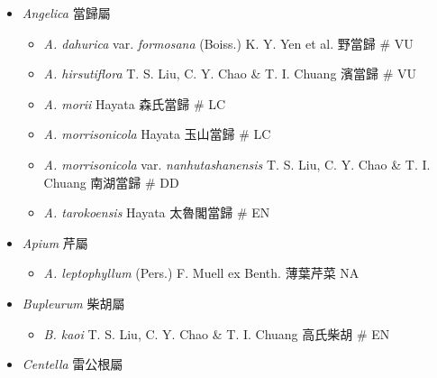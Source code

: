 
  \begin{itemize}
 \item[] \textit{Angelica} 當歸屬
                                
  \begin{itemize}
        \item[] \textit{A. dahurica} var. \textit{formosana} (Boiss.) K. Y. Yen et al.  野當歸  \# VU
        \item[] \textit{A. hirsutiflora} T. S. Liu, C. Y. Chao \& T. I. Chuang  濱當歸  \# VU
        \item[] \textit{A. morii} Hayata  森氏當歸  \# LC
        \item[] \textit{A. morrisonicola} Hayata  玉山當歸  \# LC
        \item[] \textit{A. morrisonicola} var. \textit{nanhutashanensis} T. S. Liu, C. Y. Chao \& T. I. Chuang  南湖當歸  \# DD
        \item[] \textit{A. tarokoensis} Hayata  太魯閣當歸  \# EN
  \end{itemize}
 \item[] \textit{Apium} 芹屬
                                
  \begin{itemize}
        \item[] \textit{A. leptophyllum} (Pers.) F. Muell ex Benth.  薄葉芹菜   NA
  \end{itemize}
 \item[] \textit{Bupleurum} 柴胡屬
                                
  \begin{itemize}
        \item[] \textit{B. kaoi} T. S. Liu, C. Y. Chao \& T. I. Chuang  高氏柴胡  \# EN
  \end{itemize}
 \item[] \textit{Centella} 雷公根屬
                                

\end{itemize}
